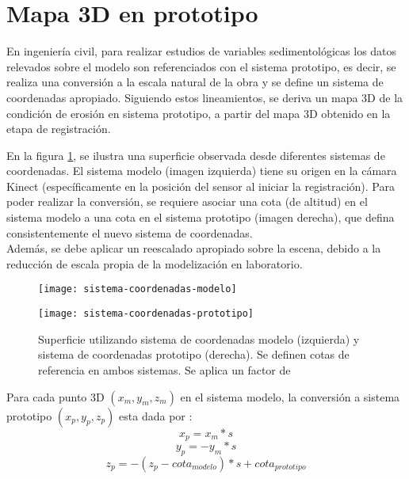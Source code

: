 \section{Mapa 3D en prototipo}
\label{sec:conversion-mapa3D-prototipo}

En ingeniería civil, para realizar estudios de variables sedimentológicas los datos relevados sobre el modelo son referenciados con el sistema prototipo, es decir, se realiza una conversión a la escala natural de la obra y se define un sistema de coordenadas apropiado. Siguiendo estos lineamientos, se deriva un mapa 3D de la condición de erosión en sistema prototipo, a partir del mapa 3D obtenido en la etapa de registración.

En la figura \ref{fig:sistemas-de-coordenadas}, se ilustra una superficie observada desde diferentes sistemas de coordenadas. El sistema modelo (imagen izquierda) tiene su origen en la cámara Kinect (específicamente en la posición del sensor al iniciar la registración). Para poder realizar la conversión, se requiere asociar una cota (de altitud) en el sistema modelo a una cota en el sistema prototipo (imagen derecha), que defina consistentemente el nuevo sistema de coordenadas. \\ 
Además, se debe aplicar un reescalado apropiado sobre la escena, debido a la reducción de escala propia de la modelización en laboratorio.\\

\begin{figure}[ht]
\centering
\begin{minipage}[ht]{.45\textwidth}
\begin{center}
\texttt{[image: sistema-coordenadas-modelo]}
\end{center}
\end{minipage}
\hfill
\begin{minipage}[ht]{.45\textwidth}
\begin{center}
\texttt{[image: sistema-coordenadas-prototipo]}
\end{center}
\end{minipage}
\hfill
\caption[Sistemas de coordenadas modelo y prototipo]{Superficie utilizando sistema de coordenadas modelo (izquierda) y sistema de coordenadas prototipo (derecha). Se definen cotas de referencia en ambos sistemas. Se aplica un factor de }
\label{fig:sistemas-de-coordenadas}
\end{figure}

Para cada punto 3D $(x_{m}, y_{m}, z_{m})$ en el sistema modelo, la conversión a sistema prototipo $(x_{p}, y_{p}, z_{p})$ esta dada por :
\begin{equation}
x_{p} =   x_{m} * s
\end{equation}
\begin{equation}
y_{p} = - y_{m} * s
\end{equation}
\begin{equation}
z_{p} = - (z_{p} - cota_{modelo}) * s + cota_{prototipo}
\end{equation}

